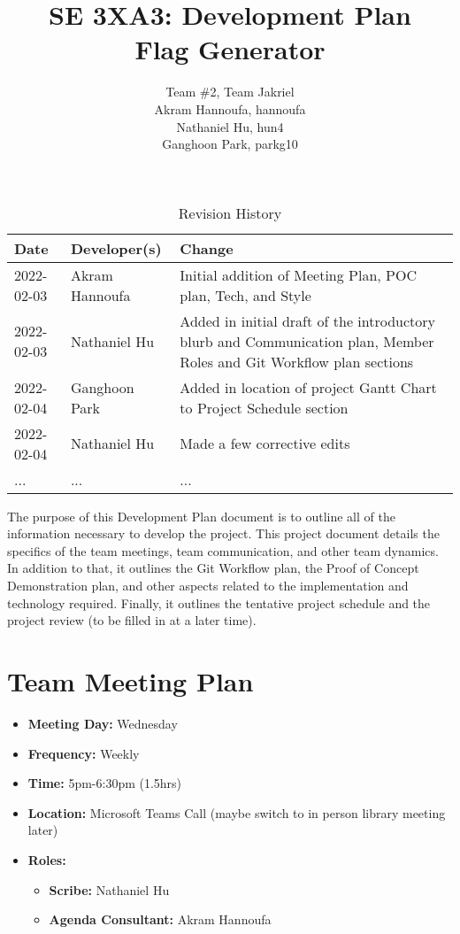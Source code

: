 \documentclass{article}
\title{SE 3XA3: Development Plan\\Flag Generator}
\author{Team \#2, Team Jakriel
		\\ Akram Hannoufa, hannoufa
		\\ Nathaniel Hu, hun4
		\\ Ganghoon Park, parkg10
}
\date{}
\begin{document}
\begin{table}[hp]
\caption{Revision History} \label{TblRevisionHistory}
\begin{tabularx}{\textwidth}{llX}
\toprule
\textbf{Date} & \textbf{Developer(s)} & \textbf{Change}\\
\midrule
2022-02-03 & Akram Hannoufa & Initial addition of Meeting Plan, POC plan, Tech, and Style\\
2022-02-03 & Nathaniel Hu & Added in initial draft of the introductory blurb and Communication plan, Member Roles and Git Workflow plan sections\\
2022-02-04 & Ganghoon Park & Added in location of project Gantt Chart to Project Schedule section\\
2022-02-04 & Nathaniel Hu & Made a few corrective edits\\
... & ... & ...\\
\bottomrule
\end{tabularx}
\end{table}

\newpage

\maketitle

\noindent The purpose of this Development Plan document is to outline all of the information necessary to develop the project. This project document details the specifics of the team meetings, team communication, and other team dynamics. In addition to that, it outlines the Git Workflow plan, the Proof of Concept Demonstration plan, and other aspects related to the implementation and technology required. Finally, it outlines the tentative project schedule and the project review (to be filled in at a later time).

\section{Team Meeting Plan}
\begin{itemize}
	\item \textbf{Meeting Day:} Wednesday
	\item \textbf{Frequency:} Weekly
	\item \textbf{Time:} 5pm-6:30pm (1.5hrs)
	\item \textbf{Location:} Microsoft Teams Call (maybe switch to in person library meeting later)
	\item \textbf{Roles:} 
	\begin{itemize}
		\item \textbf{Scribe: } Nathaniel Hu 
		\item \textbf{Agenda Consultant: } Akram Hannoufa
	\end{itemize}
\end{itemize}
\end{document}
